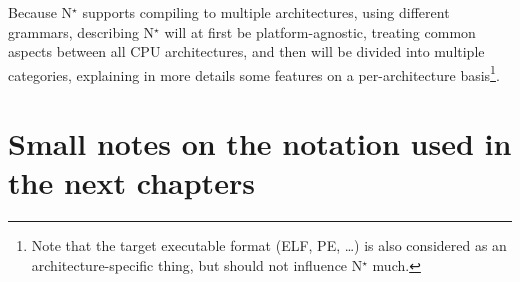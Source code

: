 \vspace{\baselineskip}

Because N$^\star$ supports compiling to multiple architectures, using different grammars, describing N$^\star$ will at first be platform-agnostic, treating common aspects between all CPU architectures, and then will be divided into multiple categories, explaining in more details some features on a per-architecture basis\footnote{Note that the target executable format (ELF, PE, \ldots) is also considered as an architecture-specific thing, but should not influence N$^\star$ much.}.

\section*{Small notes on the notation used in the next chapters}\label{sec:nstar-abstract-notation}


